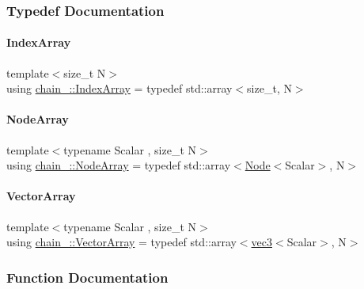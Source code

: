 \subsubsection{Typedef Documentation}
\mbox{\label{namespacechain_aa40d2da395c0ac2bc5f37832442ac403}} 
\paragraph{\texorpdfstring{Index\+Array}{IndexArray}}
{\footnotesize\ttfamily template$<$size\+\_\+t N$>$ \\
using \mbox{\hyperlink{namespacechain_aa40d2da395c0ac2bc5f37832442ac403}{chain_\+::\+Index\+Array}} = typedef std\+::array$<$size\+\_\+t, N$>$}

\mbox{\label{namespacechain_a3a021b84403e03113e1dcd61ba304963}} 
\paragraph{\texorpdfstring{Node\+Array}{NodeArray}}
{\footnotesize\ttfamily template$<$typename Scalar , size\+\_\+t N$>$ \\
using \mbox{\hyperlink{namespacechain_a3a021b84403e03113e1dcd61ba304963}{chain_\+::\+Node\+Array}} = typedef std\+::array$<$\mbox{\hyperlink{structchain_1_1_node}{Node}}$<$Scalar$>$, N$>$}

\mbox{\label{namespacechain_aa715d2f046187ea9f0c3ea55605d6214}} 
\paragraph{\texorpdfstring{Vector\+Array}{VectorArray}}
{\footnotesize\ttfamily template$<$typename Scalar , size\+\_\+t N$>$ \\
using \mbox{\hyperlink{namespacechain_aa715d2f046187ea9f0c3ea55605d6214}{chain_\+::\+Vector\+Array}} = typedef std\+::array$<$\mbox{\hyperlink{structvec3}{vec3}}$<$Scalar$>$, N$>$}



\subsubsection{Function Documentation}
\mbox{\label{namespacechain_a68d5d08ece7d82a6b4bb1968b783a8f3}} 
